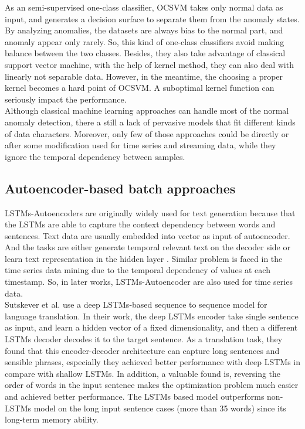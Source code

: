 As an semi-supervised one-class classifier, OCSVM takes only normal data as input, and generates a decision surface to separate them from the anomaly states. By analyzing anomalies, the datasets are always bias to the normal part, and anomaly appear only rarely. So, this kind of one-class classifiers avoid making balance between the two classes. Besides, they also take advantage of classical support vector machine, with the help of kernel method, they can also deal with linearly not separable data. However, in the meantime, the choosing a proper kernel becomes a hard point of OCSVM. A suboptimal kernel function can seriously impact the performance.\\

Although classical machine learning approaches can handle most of the normal anomaly detection, there a still a lack of pervasive models that fit different kinds of data characters. Moreover, only few of those approaches could be directly or after some modification used for time series and streaming data, while they ignore the temporal dependency between samples.



\subsection{Autoencoder-based batch approaches}
\label{sec:Autoencoder-based batch approaches}

LSTMs-Autoencoders are originally widely used for text generation because that the LSTMs are able to capture the context dependency between words and sentences. Text data are usually embedded into vector as input of autoencoder. And the tasks are either generate temporal relevant text on the decoder side or learn text representation in the hidden layer \cite{phraserepresentation}. Similar problem is faced in the time series data mining due to the temporal dependency of values at each timestamp. So, in later works, LSTMs-Autoencoder are also used for time series data.\\

Sutskever et al. \cite{seq2seq} use a deep LSTMs-based sequence to sequence model for language translation. In their work, the deep LSTMs encoder take single sentence as input, and learn a hidden vector of a fixed dimensionality, and then a different LSTMs decoder decodes it to the target sentence.  As a translation task, they found that this encoder-decoder architecture can capture long sentences and sensible phrases, especially they achieved better performance with deep LSTMs in compare with shallow LSTMs. In addition, a valuable found is, reversing the order of words in the input sentence makes the optimization problem much easier and achieved better performance. The LSTMs based model outperforms non-LSTMs model on the long input sentence cases (more than 35 words) since its long-term memory ability.\\

